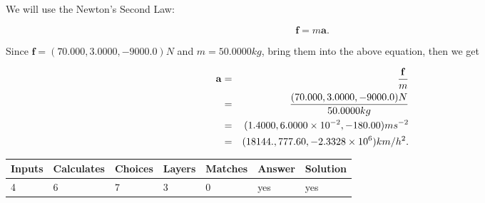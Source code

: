 \documentclass[12pt]{article}
\begin{document}
 
\noindent{}
 
 
 
 
 
 
\noindent{}
 
 

We will use the Newton's Second Law:
 
\[
\mathbf{f}=m\mathbf{a}.
\]
 
Since $\mathbf{f}=( %
70.000,  %
3.0000,  %
-9000.0 )N$
and $m= %
50.0000kg$, bring them into the above equation, then we get
 
\begin{eqnarray*}
\mathbf{a}&=&\frac{\mathbf{f}}m  \\
&=&\frac{(
70.000 ,
3.0000 ,
-9000.0 )N
}{ %
50.0000 kg}  \\
&=&(
1.4000 ,
6.0000 \times 10^{-2},
-180.00
)ms^{-2} \\
&=&(
18144. ,
777.60 ,
-2.3328 \times 10^{6}
)km/h^2.
\end{eqnarray*}
 
 
 
\noindent{}
 
 

 
\vspace{0.3in}
   
   
   
   
\noindent\begin{tabular}{|l|l|l|l|l|l|l|}
 \hline
Inputs & Calculates & Choices & Layers & Matches & Answer & Solution \\ \hline
           4  & 
           6  & 
           7
  & 
           3  & 
           0  & 
  yes & 
  yes 
  \\ \hline
 \end{tabular}
   
   
   
   
\noindent{}
   
   
  
\end{document}

